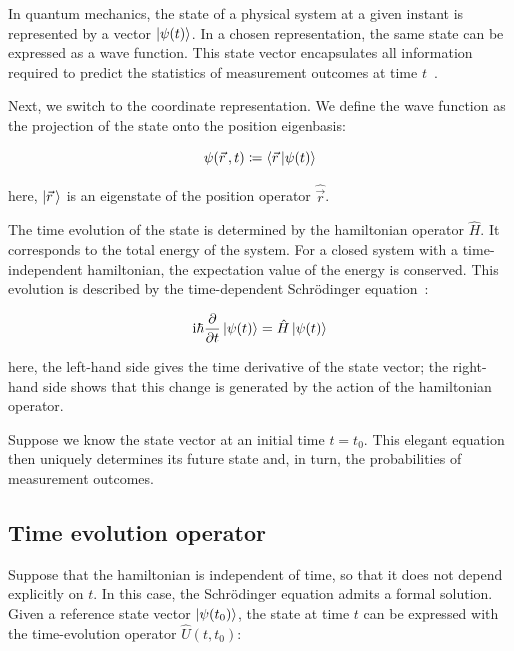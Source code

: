 In quantum mechanics, the state of a physical system at a given instant is represented by a vector $\ket{\psi(t)}$.
In a chosen representation, the same state can be expressed as a wave function.
This state vector encapsulates all information required to predict the statistics of measurement outcomes at time $t$~\cite{cohentannoudji1977quantum}.

Next, we switch to the coordinate representation.
We define the wave function as the projection of the state onto the position eigenbasis:

\begin{equation}
    \psi(\vec{r}\,,t)\coloneqq \braket{\vec{r}\,|\psi(t)}
\label{coordinate_representation_definition}
\end{equation}

here, $\ket{\vec{r}\,}$ is an eigenstate of the position operator $\hat{\vec{r}}$.

The time evolution of the state is determined by the hamiltonian operator $\hat{H}$.
It corresponds to the total energy of the system.
For a closed system with a time-independent hamiltonian, the expectation value of the energy is conserved. This evolution is described by the time-dependent Schrödinger equation~\cite{shankar2012principles}:

\begin{equation}
    \mathrm{i}\hbar\frac{\partial}{\partial t}\ket{\psi(t)}=\hat{H}\ket{\psi(t)}
\label{time-dependent_Schrodinger_equation}
\end{equation}

here, the left-hand side gives the time derivative of the state vector;
the right-hand side shows that this change is generated by the action of the hamiltonian operator.

Suppose we know the state vector at an initial time $t=t_0$. This elegant equation then uniquely determines its future state and, in turn, the probabilities of measurement outcomes.

\FloatBarrier
\subsection{Time evolution operator}

Suppose that the hamiltonian is independent of time, so that it does not depend explicitly on $t$.
In this case, the Schrödinger equation admits a formal solution.
Given a reference state vector $\ket{\psi(t_0)}$,
the state at time $t$ can be expressed with the time-evolution operator $\hat{U}(t,t_0)$:

